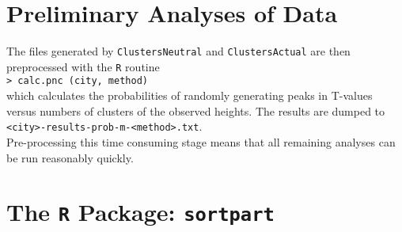\documentclass[a4paper,oneside]{article}
\begin{document}
\section{Preliminary Analyses of Data}

The files generated by {\tt ClustersNeutral} and {\tt ClustersActual} are then preprocessed with the {\tt R} routine\\
{\tt > calc.pnc (city, method)}\\
which calculates the probabilities of randomly generating peaks in T-values versus numbers of clusters of the observed heights. The results are
dumped to\\
{\tt <city>-results-prob-m-<method>.txt}.\\
Pre-processing this time consuming stage means that all remaining analyses can be run reasonably quickly.

\section{The {\tt R} Package: {\tt sortpart}}
\end{document}
